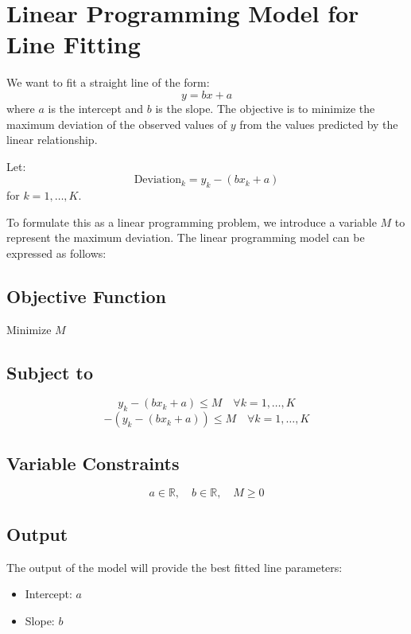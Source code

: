 \documentclass{article}
\begin{document}
\section*{Linear Programming Model for Line Fitting}

We want to fit a straight line of the form:
\[
y = bx + a
\]
where \(a\) is the intercept and \(b\) is the slope. The objective is to minimize the maximum deviation of the observed values of \(y\) from the values predicted by the linear relationship. 

Let:
\[
\text{Deviation}_{k} = y_{k} - (bx_{k} + a)
\]
for \(k = 1, \ldots, K\).

To formulate this as a linear programming problem, we introduce a variable \(M\) to represent the maximum deviation. The linear programming model can be expressed as follows:

\subsection*{Objective Function}
Minimize \(M\)

\subsection*{Subject to}
\[
y_{k} - (bx_{k} + a) \leq M \quad \forall k = 1, \ldots, K
\]
\[
-(y_{k} - (bx_{k} + a)) \leq M \quad \forall k = 1, \ldots, K
\]

\subsection*{Variable Constraints}
\[
a \in \mathbb{R}, \quad b \in \mathbb{R}, \quad M \geq 0
\]

\subsection*{Output}
The output of the model will provide the best fitted line parameters:
\begin{itemize}
    \item Intercept: \(a\)
    \item Slope: \(b\)
\end{itemize}
\end{document}

